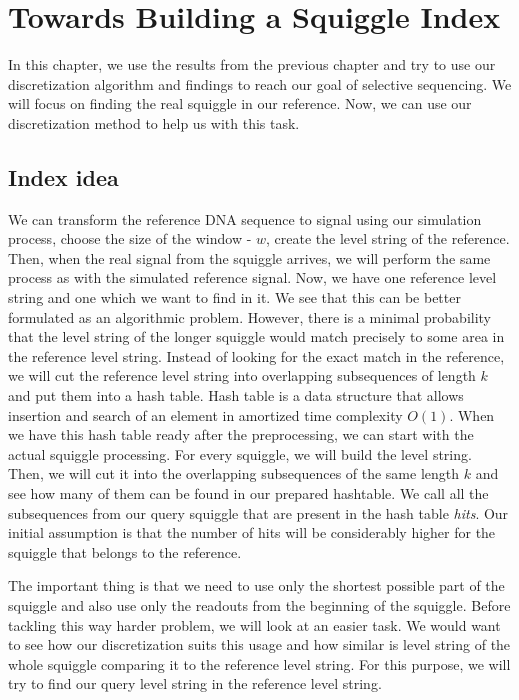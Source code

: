 \chapter{Towards Building a Squiggle Index}

\label{kap:methAdjust} %

In this chapter, we use the results from the previous chapter and try to use our
discretization algorithm and findings to reach our goal of selective sequencing.
We will focus on finding the real squiggle in our reference. Now, we can use our
discretization method to help us with this task.

\section{Index idea}

We can transform the reference DNA sequence to signal using our simulation
process, choose the size of the window - $w$, create the level string of the reference.
Then, when the real signal from the squiggle arrives, we will perform the same process
as with the simulated reference signal. Now, we have one reference level string and
one which we want to find in it. We see that this can be better formulated as an
algorithmic problem. However, there is a minimal probability that the level string
of the longer squiggle would match precisely to some area in the reference level string.
Instead of looking for the exact match in the reference, we will cut the reference
level string into overlapping subsequences of length $k$ and put them into a hash table.
Hash table is a data structure that allows insertion and search of an element in
amortized time complexity $O(1)$. When we have this hash table ready after the
preprocessing, we can start with the actual squiggle processing. For every squiggle, we will
build the level string. Then, we will cut it into the overlapping
subsequences of the same length $k$ and see how many of them can be found in our
prepared hashtable. We call all the subsequences from our query squiggle that are
present in the hash table \textit{hits}. Our initial assumption is that the number
of hits will be considerably higher for the squiggle that belongs to the reference.

The important thing is that we need to use only the shortest possible part of the squiggle
and also use only the readouts from the beginning of the squiggle. Before tackling
this way harder problem, we will look at an easier task. We would want to see how
our discretization suits this usage and how similar is level string of the whole squiggle
comparing it to the reference level string. For this purpose, we will try to
find our query level string in the reference level string.

